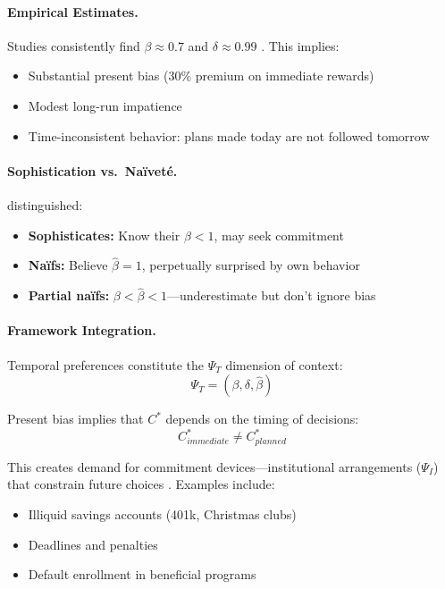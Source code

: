 \paragraph{Empirical Estimates.}
Studies consistently find $\beta \approx 0.7$ and $\delta \approx 0.99$
\citep{frederick2002time,cohen2020measuring}. This implies:
\begin{itemize}
  \item Substantial present bias (30\% premium on immediate rewards)
  \item Modest long-run impatience
  \item Time-inconsistent behavior: plans made today are not followed tomorrow
\end{itemize}

\paragraph{Sophistication vs.\ Naïveté.}
\citet{odonoghue1999doing, odonoghue2001} distinguished:
\begin{itemize}
  \item \textbf{Sophisticates:} Know their $\beta < 1$, may seek commitment
  \item \textbf{Naïfs:} Believe $\hat{\beta} = 1$, perpetually surprised by own behavior
  \item \textbf{Partial naïfs:} $\beta < \hat{\beta} < 1$---underestimate but don't ignore bias
\end{itemize}

\paragraph{Framework Integration.}
Temporal preferences constitute the $\Psi_T$ dimension of context:
\begin{equation}
  \Psi_T = (\beta, \delta, \hat{\beta})
\end{equation}

Present bias implies that $C^*$ depends on the timing of decisions:
\begin{equation}
  C^*_{immediate} \neq C^*_{planned}
\end{equation}

This creates demand for commitment devices---institutional arrangements ($\Psi_I$)
that constrain future choices \citep{ashraf2006,bryan2010}. Examples include:
\begin{itemize}
  \item Illiquid savings accounts (401k, Christmas clubs)
  \item Deadlines and penalties
  \item Default enrollment in beneficial programs \citep{madrian2001}
\end{itemize}

